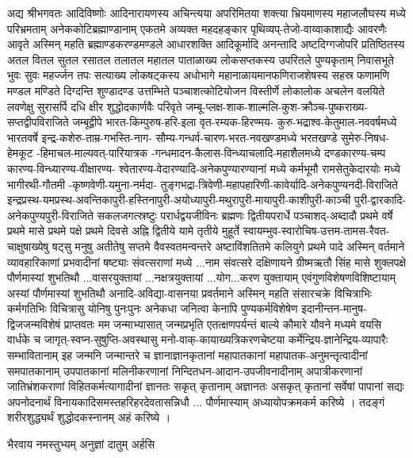 अद्य श्रीभगवतः आदिविष्णोः आदिनारायणस्य अचिन्त्यया अपरिमितया शक्त्या भ्रियमाणस्य महाजलौघस्य मध्ये परिभ्रमताम् अनेककोटिब्रह्माण्डानाम् एकतमे अव्यक्त महदहङ्कार पृथिव्यप्-तेजो-वाय्वाकाशाद्यैः आवरणैः आवृते अस्मिन् महति ब्रह्माण्डकरण्डमण्डले आधारशक्ति आदिकूर्मादि अनन्तादि अष्टदिग्गजोपरि प्रतिष्ठितस्य अतल वितल सुतल रसातल तलातल महातल पाताळाख्य लोकसप्तकस्य उपरितले पुण्यकृताम् निवासभूते भुवः सुवः महर्ज्जन तपः सत्याख्य लोकषट्कस्य अधोभागे महानाळायमानफणिराजशेषस्य सहस्र फणामणि मण्डल मण्डिते दिग्दन्ति शुण्डादण्ड उत्तम्भिते पञ्चाशत्कोटियोजन विस्तीर्णे लोकालोक अचलेन वलयिते लवणेक्षु सुरासर्पि दधि क्षीर शुद्धोदकार्णवैः परिवृते जम्बू-प्लक्ष-शाक-शाल्मलि-कुश-क्रौञ्च-पुष्कराख्य-सप्तद्वीपविराजिते जम्बूद्वीपे भारत-किम्पुरुष-हरि-इला वृत-रम्यक-हिरण्मय- कुरु-भद्राश्व-केतुमाल-नववर्षमध्ये भारतवर्षे इन्द्र-कशेरु-ताम्र-गभस्ति-नाग- सौम्य-गन्धर्व-चारण-भरत-नवखण्डमध्ये भरतखण्डे सुमेरु-निषध-हेमकूट -हिमाचल-माल्यवत्-पारियात्रक -गन्धमादन-कैलास-विन्ध्याचलादि-महाशैलमध्ये दण्डकारण्य-चम्प कारण्य-विन्ध्यारण्य-वीक्षारण्य- श्वेतारण्य-वेदारण्यादि-अनेकपुण्यारण्यानां मध्ये कर्मभूमौ रामसेतुकेदारयोः मध्ये भागीरथी-गौतमी -कृष्णवेणी-यमुना-नर्मदा- तुङ्गभद्रा-त्रिवेणी-महापहारिणी-कावेर्यादि-अनेकपुण्यनदी-विराजिते इन्द्रप्रस्थ-यमप्रस्थ-अवन्तिकापुरी-हस्तिनापुरी-अयोध्यापुरी-मथुरापुरी-मायापुरी-काशीपुरी-काञ्ची पुरी-द्वारकादि- अनेकपुण्यपुरी-विराजिते     सकलजगत्स्रष्टुः परार्धद्वयजीविनः ब्रह्मणः द्वितीयपरार्धे पञ्चाशद्-अब्दादौ प्रथमे वर्षे प्रथमे मासे प्रथमे पक्षे प्रथमे दिवसे अह्नि द्वितीये यामे तृतीये मुहूर्ते स्वायम्भुव-स्वारोचिष-उत्तम-तामस-रैवत-चाक्षुषाख्येषु षट्सु मनुषु अतीतेषु सप्तमे वैवस्वतमन्वन्तरे अष्टाविंशतितमे कलियुगे प्रथमे पादे अस्मिन् वर्तमाने व्यावहारिकाणां प्रभवादीनां षष्ट्याः संवत्सराणां मध्ये ...नाम संवत्सरे दक्षिणायने ग्रीष्मऋतौ सिंह मासे शुक्लपक्षे पौर्णमास्यां शुभतिथौ ...वासरयुक्तायां ...नक्षत्रयुक्तायां ...योग...करण युक्तायाम् एवंगुणविशेषणविशिष्टायाम् अस्यां पौर्णमास्यां शुभतिथौ 
    अनादि-अविद्या-वासनया प्रवर्तमाने अस्मिन् महति संसारचक्रे विचित्राभिः कर्मगतिभिः विचित्रासु योनिषु पुनःपुनः अनेकधा जनित्वा केनापि पुण्यकर्मविशेषेण इदानीन्तन-मानुष-द्विजजन्मविशेषं प्राप्तवतः मम जन्माभ्यासात् जन्मप्रभृति एतत्क्षणपर्यन्तं बाल्ये कौमारे यौवने मध्यमे वयसि वार्धके च जागृत्-स्वप्न-सुषुप्ति-अवस्थासु मनो-वाक्-कायाख्यत्रिकरणचेष्टया कर्मेन्द्रिय-ज्ञानेन्द्रिय-व्यापारैः सम्भावितानाम् इह जन्मनि जन्मान्तरे च ज्ञानाज्ञानकृतानां महापातकानां महापातक-अनुमन्तृत्वादीनां समपातकानाम् उपपातकानां मलिनीकरणानां निन्दितधन-आदान-उपजीवनादीनाम् अपात्रीकरणानां जातिभ्रंशकराणां विहितकर्मत्यागादीनां ज्ञानतः सकृत् कृतानाम् अज्ञानतः असकृत् कृतानां सर्वेषां पापानां सद्यः अपनोदनार्थं  
    विनायकादिसमस्तहरिहरदेवतासन्निधौ ... पौर्णमास्याम् अध्यायोपक्रमकर्म करिष्ये । 
    तदङ्गं शरीरशुद्ध्यर्थं शुद्धोदकस्नानम् अहं करिष्ये ।
    
     {भैरवाय नमस्तुभ्यम् अनुज्ञां दातुम् अर्हसि}

    




